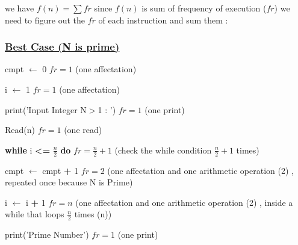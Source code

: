 we have \(f(n) = \sum fr\) since \(f(n)\) is sum of frequency of execution (\(fr\)) we need to figure out the
\(fr\) of each instruction and sum them : 

\subsubsection*{\underline{Best Case (N is prime)}}

\vspace{0.5cm}
cmpt $\gets$ 0  \hspace{4cm} \(fr = 1\) (one affectation)

\vspace{0.15cm}
i $\gets$ 1  \hspace{4.65cm} \(fr = 1\) (one affectation)

\vspace{0.15cm}
\textcolor{purplePlot!80!black}{print}(\textcolor{blueArea!60!black}{'Input Integer N\(>\)1 : '})  \hspace{0.95cm} \(fr = 1\) (one print)

\vspace{0.15cm}
\textcolor{purplePlot!80!black}{Read}(n)  \hspace{4.25cm} \(fr = 1\) (one read)

\vspace{0.15cm}

\textbf{while} i \textcolor{redPlot}{\textbf{\textless=}} \(\frac{n}{2}\)  \textbf{do} \hspace{2.7cm} \(fr = \frac{n}{2}+1\) (check the while condition \(\frac{n}{2}+1\) times)


\vspace{0.15cm}
cmpt $\gets$ cmpt \textcolor{redPlot}{ \textbf{+}} 1 \hspace{2.6cm} \(fr = 2\) (one affectation and one arithmetic operation (2) , repeated once because N is Prime)

\vspace{0.15cm}
i $\gets$ i \textcolor{redPlot}{ \textbf{+}} 1 \hspace{4cm} \(fr = n\) (one affectation and one arithmetic operation (2) , inside a while that loops \(\frac{n}{2}\) times (n))

\vspace{0.15cm}

\textcolor{purplePlot!80!black}{print}(\textcolor{blueArea!60!black}{'Prime Number'}) \hspace{1.95cm} \(fr = 1\) (one print)

